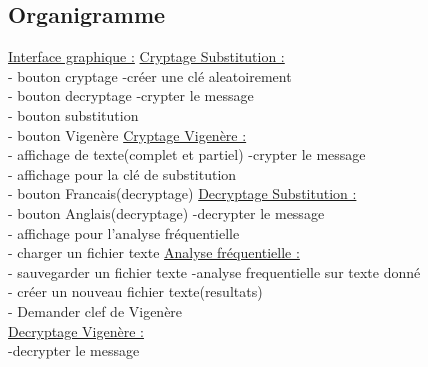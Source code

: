 \documentclass[a4]{article}
\begin{document}
		\subsection{Organigramme}
			\underline{Interface graphique :}     \hspace{5cm}  \underline{Cryptage Substitution :}\\
			- bouton cryptage            \hspace{5.5cm}       -créer une clé aleatoirement\\
			- bouton decryptage         \hspace{5cm}        -crypter le message\\
			- bouton substitution\\
			- bouton Vigenère           \hspace{5.2cm}       \underline{Cryptage Vigenère :}\\
			- affichage de texte(complet et partiel)  \hspace{2.2cm} -crypter le message\\
			- affichage pour la clé de substitution\\
			- bouton Francais(decryptage)   \hspace{3.5cm}     \underline{Decryptage Substitution :}\\
			- bouton Anglais(decryptage)    \hspace{3.5cm}     -decrypter le message\\
			- affichage pour l'analyse fréquentielle\\
			- charger un fichier texte       \hspace{4.2cm}  \underline{Analyse fréquentielle :}\\
			- sauvegarder un fichier texte     \hspace{3.8cm}  -analyse frequentielle sur texte donné\\
			- créer un nouveau fichier texte(resultats)\\
			- Demander clef de Vigenère\\
			\underline{Decryptage Vigenère :}\\
			-decrypter le message
			
\end{document}
